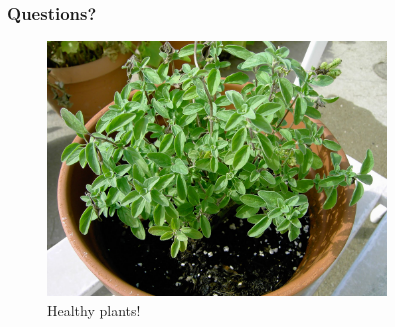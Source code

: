 \documentclass{beamer}
\begin{document}
\begin{frame}
    \frametitle{Questions?}
    \begin{figure}
        \includegraphics[width=9cm]{../img/happy-plants}
        \caption{Healthy plants!}
    \end{figure}
\end{frame}
\end{document}
